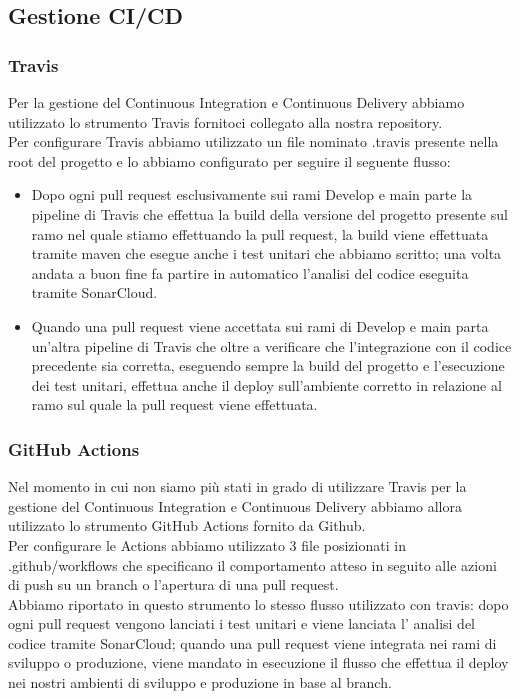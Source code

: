 \documentclass{article}
\begin{document}
\subsection{Gestione CI/CD}
\subsubsection{Travis}
Per la gestione del Continuous Integration e Continuous Delivery abbiamo utilizzato lo strumento Travis fornitoci collegato alla nostra repository.\\
Per configurare Travis abbiamo utilizzato un file nominato .travis presente nella root del progetto e lo abbiamo configurato per seguire il seguente flusso:\\
\begin{itemize}
    \item Dopo ogni pull request esclusivamente sui rami Develop e main parte la pipeline di Travis che effettua la build della versione del progetto presente sul ramo nel quale stiamo effettuando la pull request, la build viene effettuata tramite maven che esegue anche i test unitari che abbiamo scritto; una volta andata a buon fine fa partire in automatico l’analisi del codice eseguita tramite SonarCloud.\\
    \item Quando una pull request viene accettata sui rami di Develop e main parta un’altra pipeline di Travis che oltre a verificare che l’integrazione con il codice precedente sia corretta, eseguendo sempre la build del progetto e l’esecuzione dei test unitari, effettua anche il deploy sull’ambiente corretto in relazione al ramo sul quale la pull request viene effettuata.
\end{itemize}
\subsubsection{GitHub Actions}
Nel momento in cui non siamo più stati in grado di utilizzare Travis per la gestione del Continuous Integration e Continuous Delivery abbiamo allora utilizzato lo strumento GitHub Actions fornito da Github.\\
Per configurare le Actions abbiamo utilizzato 3 file posizionati in .github/workflows che specificano il comportamento atteso in seguito alle azioni di push su un branch o l’apertura di una pull request.\\
Abbiamo riportato in questo strumento lo stesso flusso utilizzato con travis: dopo ogni pull request vengono lanciati i test unitari e viene lanciata l’ analisi del codice tramite SonarCloud; quando una pull request viene integrata nei rami di sviluppo o produzione, viene mandato in esecuzione il flusso che effettua il deploy nei nostri ambienti di sviluppo e produzione in base al branch.
\end{document}
